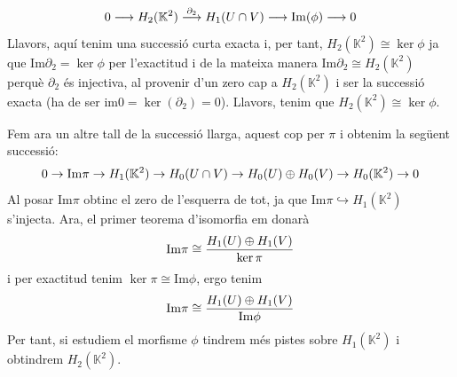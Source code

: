 \documentclass[../main.tex]{subfiles}
\begin{document}
\begin{sol}
\begin{equation}
    \notag
    0\longrightarrow H_2(\mathbb{K}^2)\overset{\partial_2}{\longrightarrow} H_1(U\cap V)\longrightarrow \mathrm{Im}(\phi)\longrightarrow 0
\end{equation}
Llavors, aquí tenim una successió curta exacta i, per tant, $H_2(\mathbb{K}^2)\cong\ker\phi$ ja que $\mathrm{Im}\partial_2 = \ker\phi$ per l'exactitud i de la mateixa manera $\mathrm{Im}\partial_2\cong H_2(\mathbb{K}^2)$ perquè $\partial_2$ és injectiva, al provenir d'un zero cap a $H_2(\mathbb{K}^2)$ i ser la successió exacta (ha de ser $\mathrm{im}0 = \ker(\partial_2) = 0$). Llavors, tenim que $H_2(\mathbb{K}^2)\cong\ker\phi$.

Fem ara un altre tall de la successió llarga, aquest cop per $\pi$ i obtenim la següent successió:
\begin{equation}
    \notag
    0\rightarrow \mathrm{Im}\pi\rightarrow H_1(\mathbb{K}^2)\rightarrow H_0(U\cap V)\rightarrow H_0(U)\oplus H_0(V)\rightarrow H_0(\mathbb{K}^2)\rightarrow 0
\end{equation}
Al posar $\mathrm{Im}\pi$ obtinc el zero de l'esquerra de tot, ja que $\mathrm{Im}\pi\hookrightarrow H_1(\mathbb{K}^2)$ s'injecta. Ara, el primer teorema d'isomorfia em donarà
\begin{equation}
    \notag
    \mathrm{Im}\pi\cong \frac{H_1(U)\oplus H_1(V)}{\ker\pi}
\end{equation}
i per exactitud tenim $\ker\pi\cong \mathrm{Im}\phi$, ergo tenim 
\begin{equation}
    \notag
    \mathrm{Im}\pi\cong \frac{H_1(U)\oplus H_1(V)}{\mathrm{Im}\phi}
\end{equation}
Per tant, si estudiem el morfisme $\phi$ tindrem més pistes sobre $H_1(\mathbb{K}^2)$ i obtindrem $H_2(\mathbb{K}^2)$.


\end{sol}
\end{document}

